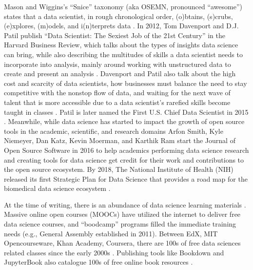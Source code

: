 \documentclass[010-intro.tex]{subfiles}
\begin{document}
    Mason and Wiggins's ``Snice'' taxonomy (aka OSEMN, pronounced ``awesome'') states that a data scientist,
    in rough chronological order,
    (o)btains, (s)crubs, (e)xplores, (m)odels, and i(n)terprets data
    \cite{masonTaxonomyDataScience2010}.
    In 2012, Tom Davenport and D.J. Patil publish
    ``Data Scientist: The Sexiest Job of the 21st Century''
    in the Harvard Business Review,
    which talks about the types of insights data science can bring,
    while also describing the multitudes of skills a data scientist needs to incorporate into analysis,
    mainly around working with unstructured data to create and present an analysis
    \cite{davenportDataScientistSexiest2012}.
    Davenport and Patil also talk about the high cost and scarcity of data scientists,
    how businesses must balance the need to stay competitive with the nonstop flow of data,
    and waiting for the next wave of talent that is more accessible
    due to a data scientist's rarefied skills become taught in classes
    \cite{davenportDataScientistSexiest2012}.
    Patil is later named the First U.S. Chief Data Scientist in 2015
    \cite{smithWhiteHouseNames2015}.
    Meanwhile, while data science has started to impact the growth of open source tools in the
    academic, scientific, and research domains
    \cite{tyagiHowFortune5002016, guszczaDataScienceOpen2015, kirschHowOpenSource2021}
    Arfon Smith, Kyle Niemeyer, Dan Katz, Kevin Moerman, and Karthik Ram start
    the Journal of Open Source Software in 2016 \cite{smithJournalOpenSource2018}
    to help academics performing data science research and creating tools for data science get
    credit for their work and contributions to the open source ecosystem.
    By 2018,
    The National Institute of Health (NIH) released its first Strategic Plan for Data Science
    that provides a road map for the biomedical data science ecosystem
    \cite{nationalinstitutesofhealthNIHStrategicPlan2020}.
    
    
    At the time of writing,
    there is an abundance of data science learning materials
    \cite{krossDemocratizationDataScience2020}.
    Massive online open courses (MOOCs) have utilized the internet to deliver free
    data science courses,
    and ``boodcamp'' programs filled the immediate training needs (e.g., General Assembly established in 2011).
    Between EdX, MIT Opencourseware, Khan Academy, Coursera, there are 100s of free data sciences related classes
    since the early 2000s
    \cite{courseraTopFreeCourses, udacityDataScienceOnline, edxDataAnalysisCourses}.
    Publishing tools like Bookdown and
    JupyterBook
    also catalogue 100s of free online book resources
    \cite{bookdownAllBooksBookdown, executablebookprojectGalleryJupyterBooks}.
    
\end{document}
